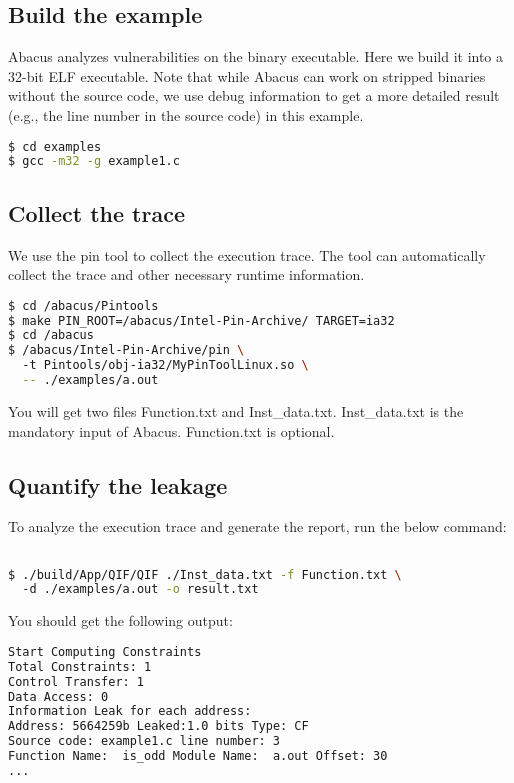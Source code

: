 \documentclass[10pt,conference]{IEEEtran}
\newcommand{\tool}{\textsf{Abacus}}
\begin{document}
\subsection{Build the example}

Abacus analyzes vulnerabilities on the binary executable. Here we build it into  a 32-bit ELF executable. Note that while Abacus can work on stripped binaries without the source code, we use debug information to get a more detailed result (e.g., the line number in the source code) in this example.
\begin{lstlisting}[language=bash]
$ cd examples
$ gcc -m32 -g example1.c
\end{lstlisting}


\subsection{Collect the trace}
We use the pin tool to collect the execution trace. The tool can automatically collect the trace and other necessary runtime information.
\begin{lstlisting}[language=bash]
$ cd /abacus/Pintools
$ make PIN_ROOT=/abacus/Intel-Pin-Archive/ TARGET=ia32
$ cd /abacus
$ /abacus/Intel-Pin-Archive/pin \ 
  -t Pintools/obj-ia32/MyPinToolLinux.so \
  -- ./examples/a.out 
\end{lstlisting}

You will get two files \textsf{Function.txt} and \textsf{Inst\_data.txt}. \textsf{Inst\_data.txt} is the mandatory input of \tool{}. \textsf{Function.txt} is optional. 

\subsection{Quantify the leakage}
To analyze the execution trace and generate the report, run the below command:
\begin{lstlisting}[language=bash]

$ ./build/App/QIF/QIF ./Inst_data.txt -f Function.txt \ 
  -d ./examples/a.out -o result.txt
\end{lstlisting}

You should get the following output:

\begin{lstlisting}[language=bash]
Start Computing Constraints
Total Constraints: 1
Control Transfer: 1
Data Access: 0
Information Leak for each address:
Address: 5664259b Leaked:1.0 bits Type: CF  
Source code: example1.c line number: 3
Function Name:  is_odd Module Name:  a.out Offset: 30
...
\end{lstlisting}
\end{document}
